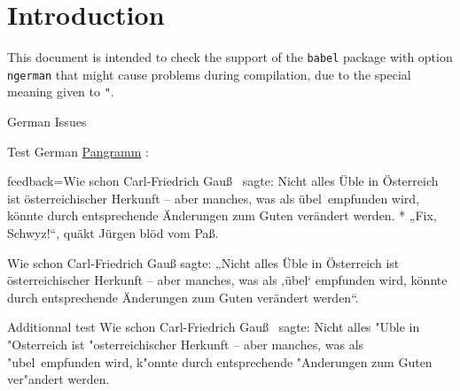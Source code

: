 \documentclass{article}
\def\myquestiontext{ \underline{Pangramm} :}
\def\pangramme{\glqq Fix, Schwyz!\grqq, qu\"akt J\"urgen bl\"od vom Pa\ss.}
\def\pangrammeother{Wie schon Carl-Friedrich Gau\ss\ %
  sagte: \glqq Nicht alles \"Uble in \"Osterreich ist 
  \"osterreichischer Herkunft -- aber manches, was als \glq 
  \"ubel\grq\ empfunden wird, k\"onnte durch entsprechende 
  \"Anderungen zum Guten ver\"andert werden\grqq.}
\def\myfeedback{}
\def\myquestiontext{ \underline{Pangramm} :}
\def\pangramme{„Fix, Schwyz!“, quäkt Jürgen blöd vom Paß.}
\def\pangrammeother{Wie schon Carl-Friedrich Gauß sagte: 
  „Nicht alles Üble in Österreich ist österreichischer 
  Herkunft – aber manches, was als ‚übel‘ empfunden wird, 
  könnte durch entsprechende Änderungen zum Guten verändert 
  werden“.}
\def\myfeedback{Wie schon Carl-Friedrich Gau\ss\ %
  sagte: \glqq Nicht alles \"Uble in \"Osterreich ist 
  \"osterreichischer Herkunft -- aber manches, was als \glq 
  \"ubel\grq\ empfunden wird, k\"onnte durch entsprechende 
  \"Anderungen zum Guten ver\"andert werden\grqq.}
\begin{document}
\section*{Introduction}

This document is intended to check the support of the \texttt{babel} package 
with option \texttt{ngerman} that might cause problems during compilation, due 
to the special meaning given to \verb|"|.

\begin{quiz}[points=1]{German Issues}
\begin{multi}[feedback={}]{Test German}
\myquestiontext
\item[feedback={\myfeedback}]* \pangramme
\item \pangrammeother
\end{multi}

\ifTUTeX
  \begin{description}{Additionnal test}
    Wie schon Carl-Friedrich Gau\ss\ %
    sagte: \glqq Nicht alles "Uble in "Osterreich ist 
    "osterreichischer Herkunft -- aber manches, was als \glq 
    "ubel\grq\ empfunden wird, k"onnte durch entsprechende 
    "Anderungen zum Guten ver"andert werden\grqq.
  \end{description}
\fi

\end{quiz}
\end{document}
